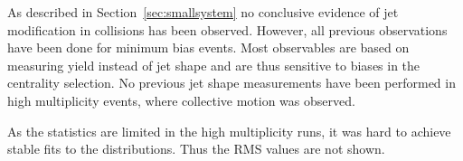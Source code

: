 As described in Section~\ref{sec:smallsystem} no conclusive evidence of jet modification in \pPb collisions has been observed. However, all previous observations have been done for minimum bias events. Most observables are based on measuring yield instead of jet shape and are thus sensitive to biases in the centrality selection. No previous jet shape measurements have been performed in high multiplicity \pPb events, where collective motion was observed.


As the statistics are limited in the high multiplicity runs, it was hard to achieve stable fits to the distributions. Thus the RMS values are not shown. 



